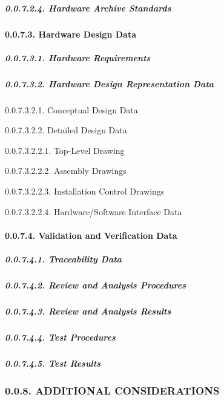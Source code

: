 \documentclass[
]{article}
\begin{document}
\hypertarget{hardware-archive-standards}{%
\subparagraph{0.0.7.2.4. Hardware Archive
Standards}\label{hardware-archive-standards}}

\hypertarget{hardware-design-data}{%
\paragraph{0.0.7.3. Hardware Design Data}\label{hardware-design-data}}

\hypertarget{hardware-requirements}{%
\subparagraph{0.0.7.3.1. Hardware
Requirements}\label{hardware-requirements}}

\hypertarget{hardware-design-representation-data}{%
\subparagraph{0.0.7.3.2. Hardware Design Representation
Data}\label{hardware-design-representation-data}}

0.0.7.3.2.1. Conceptual Design Data

0.0.7.3.2.2. Detailed Design Data

0.0.7.3.2.2.1. Top-Level Drawing

0.0.7.3.2.2.2. Assembly Drawings

0.0.7.3.2.2.3. Installation Control Drawings

0.0.7.3.2.2.4. Hardware/Software Interface Data

\hypertarget{validation-and-verification-data}{%
\paragraph{0.0.7.4. Validation and Verification
Data}\label{validation-and-verification-data}}

\hypertarget{traceability-data}{%
\subparagraph{0.0.7.4.1. Traceability Data}\label{traceability-data}}

\hypertarget{review-and-analysis-procedures}{%
\subparagraph{0.0.7.4.2. Review and Analysis
Procedures}\label{review-and-analysis-procedures}}

\hypertarget{review-and-analysis-results}{%
\subparagraph{0.0.7.4.3. Review and Analysis
Results}\label{review-and-analysis-results}}

\hypertarget{test-procedures}{%
\subparagraph{0.0.7.4.4. Test Procedures}\label{test-procedures}}

\hypertarget{test-results}{%
\subparagraph{0.0.7.4.5. Test Results}\label{test-results}}

\hypertarget{additional-considerations}{%
\subsubsection{0.0.8. ADDITIONAL
CONSIDERATIONS}\label{additional-considerations}}
\end{document}
